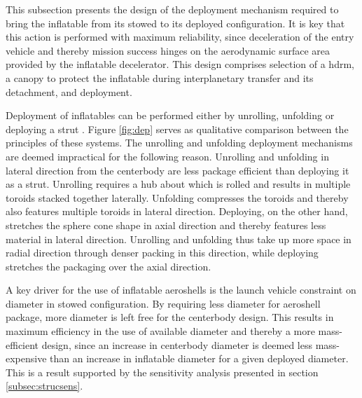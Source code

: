 This subsection presents the design of the deployment mechanism required to bring the inflatable from its stowed to its deployed configuration. It is key that this action is performed with maximum reliability, since deceleration of the entry vehicle and thereby mission success hinges on the aerodynamic surface area provided by the inflatable decelerator. This design comprises selection of a \acrfull{hdrm}, a canopy to protect the inflatable during interplanetary transfer and its detachment, and deployment.

Deployment of inflatables can be performed either by unrolling, unfolding or deploying a strut \cite[p.222-227]{Jenkins2001}. Figure \ref{fig:dep} serves as qualitative comparison between the principles of these systems. The unrolling and unfolding deployment mechanisms are deemed impractical for the following reason. Unrolling and unfolding in lateral direction from the centerbody are less package efficient than deploying it as a strut. Unrolling requires a hub about which is rolled and results in multiple toroids stacked together laterally. Unfolding compresses the toroids and thereby also features multiple toroids in lateral direction. Deploying, on the other hand, stretches the sphere cone shape in axial direction and thereby features less material in lateral direction. Unrolling and unfolding thus take up more space in radial direction through denser packing in this direction, while deploying stretches the packaging over the axial direction. 

A key driver for the use of inflatable aeroshells is the launch vehicle constraint on diameter in stowed configuration. By requiring less diameter for aeroshell package, more diameter is left free for the centerbody design. This results in maximum efficiency in the use of available diameter and thereby a more mass-efficient design, since an increase in centerbody diameter is deemed less mass-expensive than an increase in inflatable diameter for a given deployed diameter. This is a result supported by the sensitivity analysis presented in section \ref{subsec:strucsens}. 

